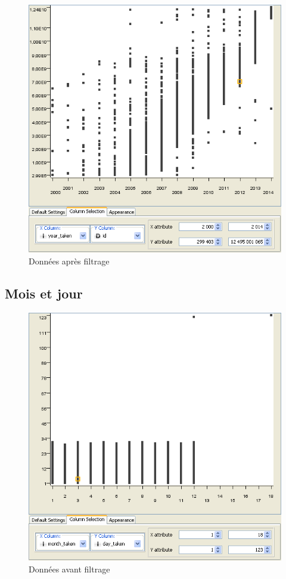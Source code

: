         \begin{figure}[h]
            \centering
            \includegraphics[scale=0.35]{../screenshots/year_id_after.png}
            \caption{Donn\'ees apr\`es filtrage}
            \label{diagram:year_id_after}
        \end{figure}

    \pagebreak
    \subsection{Mois et jour}
        \begin{figure}[h]
            \centering
            \includegraphics[scale=0.35]{../screenshots/month_day_before.png}
            \caption{Donn\'ees avant filtrage}
            \label{diagram:month_day_before}
        \end{figure}

